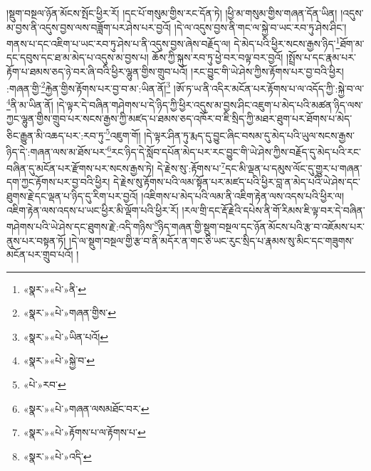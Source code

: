 །སྡུག་བསྔལ་ཉོན་མོངས་སྤོང་ཕྱིར་རོ། །དང་པོ་གསུམ་གྱིས་རང་དོན་ཏེ། །ཕྱི་མ་གསུམ་གྱིས་གཞན་དོན་ཡིན། །འདུས་མ་བྱས་ནི་འདུས་བྱས་ལས་བཟློག་པར་ཤེས་པར་བྱའོ། །དེ་ལ་འདུས་བྱས་ནི་གང་ལ་སྐྱེ་བ་ཡང་རབ་ཏུ་ཤེས་ཤིང་། གནས་པ་དང་འཇིག་པ་ཡང་རབ་ཏུ་ཤེས་པ་ནི་འདུས་བྱས་ཞེས་བརྗོད་ལ། དེ་མེད་པའི་ཕྱིར་སངས་རྒྱས་ཉིད་\footnote{«སྣར་»«པེ་»ནི་}ཐོག་མ་དང་དབུས་དང་ཐ་མ་མེད་པ་འདུས་མ་བྱས་པ། ཆོས་ཀྱི་སྐུས་རབ་ཏུ་ཕྱེ་བར་བལྟ་བར་བྱའོ། །སྤྲོས་པ་དང་རྣམ་པར་རྟོག་པ་ཐམས་ཅད་ཉེ་བར་ཞི་བའི་ཕྱིར་ལྷུན་གྱིས་གྲུབ་པའོ། །རང་བྱུང་གི་ཡེ་ཤེས་ཀྱིས་རྟོགས་པར་བྱ་བའི་ཕྱིར། :གཞན་གྱི་\footnote{«སྣར་»«པེ་»གཞན་གྱིས་}རྐྱེན་གྱིས་རྟོགས་པར་བྱ་བ་མ་:ཡིན་ནོ།\footnote{«སྣར་»«པེ་»ཡིན་པའོ།} །ཨོ་ཏ་ཡ་ནི་འདིར་མངོན་པར་རྟོགས་པ་ལ་འདོད་ཀྱི་:སྐྱེ་བ་ལ་\footnote{«སྣར་»«པེ་»སྐྱེ་བ་}ནི་མ་ཡིན་ནོ། །དེ་ལྟར་དེ་བཞིན་གཤེགས་པ་དེ་ཉིད་ཀྱི་ཕྱིར་འདུས་མ་བྱས་ཤིང་འཇུག་པ་མེད་པའི་མཚན་ཉིད་ལས་ཀྱང་ལྷུན་གྱིས་གྲུབ་པར་སངས་རྒྱས་ཀྱི་མཛད་པ་ཐམས་ཅད་འཁོར་བ་ཇི་སྲིད་ཀྱི་མཐར་ཐུག་པར་ཐོགས་པ་མེད་ཅིང་རྒྱུན་མི་འཆད་པར་:རབ་ཏུ་\footnote{«པེ་»རབ་}འཇུག་གོ། །དེ་ལྟར་ཤིན་ཏུ་རྨད་དུ་བྱུང་ཞིང་བསམ་དུ་མེད་པའི་ཡུལ་སངས་རྒྱས་ཉིད་དེ་:གཞན་ལས་མ་ཐོས་པར་\footnote{«སྣར་»«པེ་»གཞན་ལསམཐོང་བར་}རང་ཉིད་དེ་སློབ་དཔོན་མེད་པར་རང་བྱུང་གི་ཡེ་ཤེས་ཀྱིས་བརྗོད་དུ་མེད་པའི་རང་བཞིན་དུ་མངོན་པར་རྫོགས་པར་སངས་རྒྱས་ཏེ། དེ་རྗེས་སུ་:རྟོགས་པ་\footnote{«སྣར་»«པེ་»རྟོགས་པ་ལ་རྟོགས་པ་}དང་མི་ལྡན་པ་དམུས་ལོང་དུ་གྱུར་པ་གཞན་དག་ཀྱང་རྟོགས་པར་བྱ་བའི་ཕྱིར། དེ་རྗེས་སུ་རྟོགས་པའི་ལམ་སྟོན་པར་མཛད་པའི་ཕྱིར་བླ་ན་མེད་པའི་ཡེ་ཤེས་དང་ཐུགས་རྗེ་དང་ལྡན་པ་ཉིད་དུ་རིག་པར་བྱའོ། །འཇིགས་པ་མེད་པའི་ལམ་ནི་འཇིག་རྟེན་ལས་འདས་པའི་ཕྱིར་ལ། འཇིག་རྟེན་ལས་འདས་པ་ཡང་ཕྱིར་མི་ལྡོག་པའི་ཕྱིར་རོ། །རལ་གྲི་དང་རྡོ་རྗེའི་དཔེས་ནི་གོ་རིམས་ཇི་ལྟ་བར་དེ་བཞིན་གཤེགས་པའི་ཡེ་ཤེས་དང་ཐུགས་རྗེ་:འདི་གཉིས་\footnote{«སྣར་»«པེ་»འདི་}ཉིད་གཞན་གྱི་སྡུག་བསྔལ་དང་ཉོན་མོངས་པའི་རྩ་བ་འཇོམས་པར་ནུས་པར་བསྟན་ཏོ། །དེ་ལ་སྡུག་བསྔལ་གྱི་རྩ་བ་ནི་མདོར་ན་གང་ཅི་ཡང་རུང་སྲིད་པ་རྣམས་སུ་མིང་དང་གཟུགས་མངོན་པར་གྲུབ་པའོ། །
